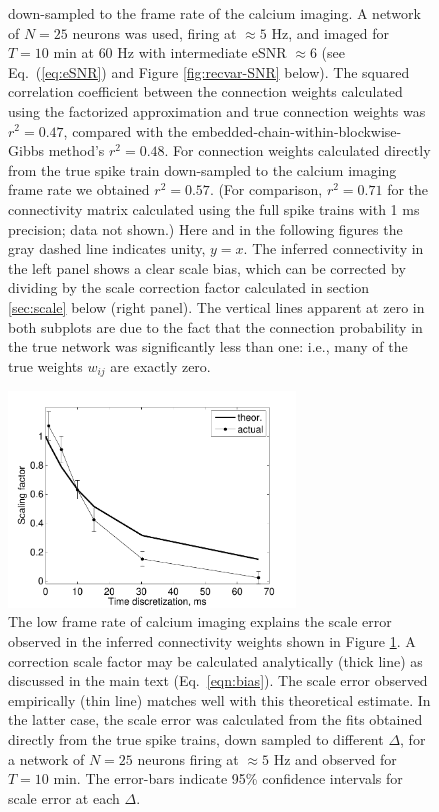 \documentclass[aoas,preprint]{imsart}
\begin{document}
\begin{figure}[t!]
{down-sampled to the frame rate of the calcium imaging. A network of
$N=25$ neurons was used, firing at $\approx 5$ Hz, and imaged for
$T=10$ min at $60$ Hz with intermediate eSNR $\approx 6$ (see
Eq.~(\ref{eq:eSNR}) and Figure \ref{fig:recvar-SNR} below).  The
squared correlation coefficient between the connection weights
calculated using the factorized approximation and true connection
weights was $r^2=0.47$, compared with the
embedded-chain-within-blockwise-Gibbs method's $r^2=0.48$. For
connection weights calculated directly from the true spike train
down-sampled to the calcium imaging frame rate we obtained $r^2=0.57$.
(For comparison, $r^2=0.71$ for the connectivity matrix calculated
using the full spike trains with 1 ms precision; data not shown.)
Here and in the following figures the gray dashed line indicates
unity, $y=x$.  The inferred connectivity in the left panel shows a
clear scale bias, which can be corrected by dividing by the scale
correction factor calculated in section \ref{sec:scale} below (right
panel).  The vertical lines apparent at zero in both subplots are due
to the fact that the connection probability in the true network was
significantly less than one: i.e., many of the true weights $w_{ij}$
are exactly zero.}
\label{fig:scatters} \end{figure}

\begin{figure}[t!]
\centering
\includegraphics[width=3in]{../figs/FigureA4_scale_bias}
\caption{The low frame rate of calcium imaging explains the scale
error observed in the inferred connectivity weights shown in Figure
\ref{fig:scatters}.  A correction scale factor may be calculated
analytically (thick line) as discussed in the main text
(Eq.~\ref{eqn:bias}).  The scale error observed empirically (thin
line) matches well with this theoretical estimate. In the latter case,
the scale error was calculated from the fits obtained directly from
the true spike trains, down sampled to different $\Delta$, for a
network of $N=25$ neurons firing at $\approx 5$ Hz and observed for
$T=10$ min. The error-bars indicate 95\% confidence intervals for
scale error at each $\Delta$.}
\label{fig:bias}
\end{figure}
\end{document}
